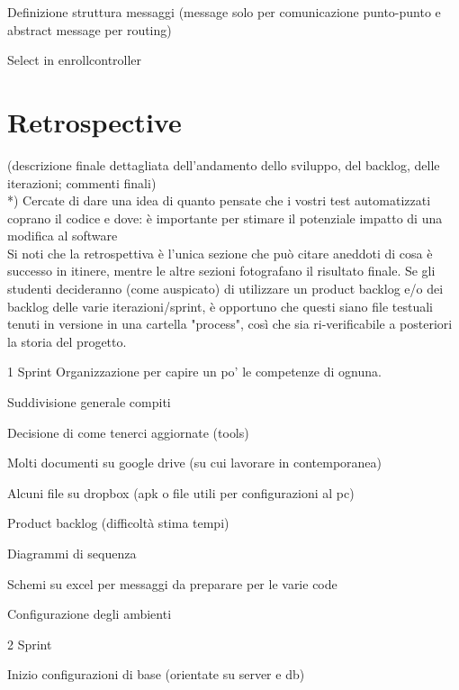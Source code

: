 \documentclass[a4paper,12pt]{report}
\begin{document}
Definizione struttura messaggi (message solo per comunicazione punto-punto e abstract message per routing)

Select in enrollcontroller


\chapter{Retrospective}

(descrizione finale dettagliata dell'andamento dello sviluppo, del backlog, delle iterazioni; commenti finali)\\

*) Cercate di dare una idea di quanto pensate che i vostri test automatizzati coprano il codice e dove: è importante per stimare il potenziale impatto di una modifica al software\\


Si noti che la retrospettiva è l'unica sezione che può citare aneddoti di cosa è successo in itinere, mentre le altre sezioni fotografano il risultato finale. Se gli studenti decideranno (come auspicato) di utilizzare un product backlog e/o dei backlog delle varie iterazioni/sprint, è opportuno che questi siano file testuali tenuti in versione in una cartella "process", così che sia ri-verificabile a posteriori la storia del progetto.

1 Sprint
Organizzazione per capire un po’ le competenze di ognuna.

Suddivisione generale compiti 

Decisione di come tenerci aggiornate (tools)

Molti documenti su google drive (su cui lavorare in contemporanea)

Alcuni file su dropbox (apk o file utili per configurazioni al pc)

Product backlog (difficoltà stima tempi)

Diagrammi di sequenza 

Schemi su excel per messaggi da preparare per le varie code

Configurazione degli ambienti

2 Sprint 

Inizio configurazioni di base (orientate su server e db) 
\end{document}
